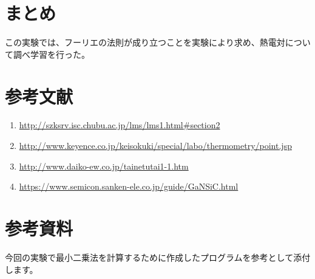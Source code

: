 \documentclass[a4j,twoside,openright,11pt]{jarticle}
\begin{document}
\section{まとめ}
この実験では、フーリエの法則が成り立つことを実験により求め、熱電対について調べ学習を行った。


\section{参考文献}
\begin{enumerate}
\item \url{http://szksrv.isc.chubu.ac.jp/lms/lms1.html#section2}
\item \url{http://www.keyence.co.jp/keisokuki/special/labo/thermometry/point.jsp}
\item \url{http://www.daiko-ew.co.jp/tainetutai1-1.htm}
\item \url{https://www.semicon.sanken-ele.co.jp/guide/GaNSiC.html}
\end{enumerate}

\section{参考資料}
今回の実験で最小二乗法を計算するために作成したプログラムを参考として添付します。
\small
\end{document}
